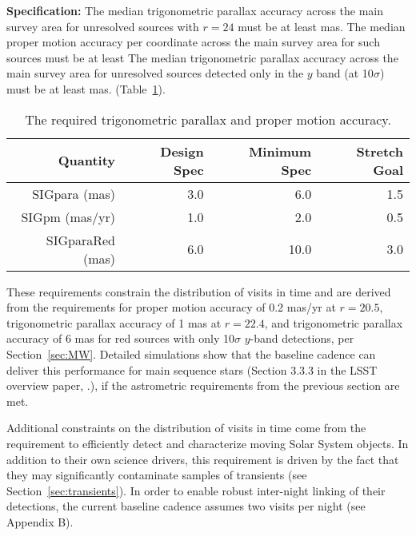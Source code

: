 \textbf{Specification:} The median trigonometric parallax accuracy across the main
survey area for unresolved sources with $r=24$ must be at least
 mas.
The median proper motion accuracy per coordinate across the main
survey area for such sources must be at least
The median trigonometric parallax accuracy across the main survey area for unresolved
sources detected only in the $y$ band (at 10$\sigma$) must be at least
 mas.
(Table~\ref{TablePARAPM}).

\begin{table}[h]
\begin{tabular}{|r|r|r|r|}
\hline
Quantity                & Design Spec & Minimum Spec & Stretch Goal       \\
\hline
  SIGpara (mas)             &    3.0     &     6.0          &    1.5         \\
  SIGpm   (mas/yr)        &    1.0     &     2.0          &    0.5         \\
  SIGparaRed (mas)        &   6.0     &    10.0          &    3.0         \\
\hline
\end{tabular}
\caption{The required trigonometric parallax and proper motion accuracy.}
\label{TablePARAPM}
\end{table}

These requirements constrain the distribution of visits in time and are derived
from the requirements for proper motion accuracy of 0.2 mas/yr at $r=20.5$,
trigonometric parallax accuracy of 1 mas at $r=22.4$, and trigonometric parallax
accuracy of 6 mas for red sources with only 10$\sigma$ $y$-band detections, per
Section~\ref{sec:MW}. Detailed simulations show that the baseline cadence can deliver
this performance for main sequence stars (Section 3.3.3 in the LSST overview paper,
\citep{2008arXiv0805.2366I}.), if the astrometric requirements from the previous section are met.


Additional constraints on the distribution of visits in time come from
the requirement to efficiently detect and characterize moving Solar System
objects. In addition to their own science drivers, this requirement is driven
by the fact that they may significantly contaminate samples of transients
(see Section~\ref{sec:transients}).  In order to enable robust inter-night
linking of their detections, the current baseline cadence assumes two
visits per night  (see Appendix B).



